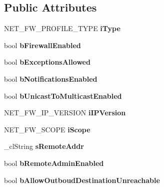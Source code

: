 \subsection*{Public Attributes}
\begin{DoxyCompactItemize}
\item 
\hypertarget{classcl_fw_profile_a5e3799163b148b64739d65f0087edef5}{
NET\_\-FW\_\-PROFILE\_\-TYPE {\bfseries iType}}
\label{classcl_fw_profile_a5e3799163b148b64739d65f0087edef5}

\item 
\hypertarget{classcl_fw_profile_ac478a134b5ffeb998ef8cc2262bd218f}{
bool {\bfseries bFirewallEnabled}}
\label{classcl_fw_profile_ac478a134b5ffeb998ef8cc2262bd218f}

\item 
\hypertarget{classcl_fw_profile_a220eca55fa271ab2137e6c2c670f8657}{
bool {\bfseries bExceptionsAllowed}}
\label{classcl_fw_profile_a220eca55fa271ab2137e6c2c670f8657}

\item 
\hypertarget{classcl_fw_profile_a7c71e03545397b2a881b934a39720778}{
bool {\bfseries bNotificationsEnabled}}
\label{classcl_fw_profile_a7c71e03545397b2a881b934a39720778}

\item 
\hypertarget{classcl_fw_profile_a07511a17c265904e7dccc212f062b040}{
bool {\bfseries bUnicastToMulticastEnabled}}
\label{classcl_fw_profile_a07511a17c265904e7dccc212f062b040}

\item 
\hypertarget{classcl_fw_profile_adb3cc684b330247ecfd3cf9cf4bd70cb}{
NET\_\-FW\_\-IP\_\-VERSION {\bfseries iIPVersion}}
\label{classcl_fw_profile_adb3cc684b330247ecfd3cf9cf4bd70cb}

\item 
\hypertarget{classcl_fw_profile_a71e485e5c5f30a8c02a8aa16fcf01a1a}{
NET\_\-FW\_\-SCOPE {\bfseries iScope}}
\label{classcl_fw_profile_a71e485e5c5f30a8c02a8aa16fcf01a1a}

\item 
\hypertarget{classcl_fw_profile_adc6f854c578329610af4296fbbff4983}{
\_\-clString {\bfseries sRemoteAddr}}
\label{classcl_fw_profile_adc6f854c578329610af4296fbbff4983}

\item 
\hypertarget{classcl_fw_profile_ab0e73804250b17110f04dae99c6d5ab1}{
bool {\bfseries bRemoteAdminEnabled}}
\label{classcl_fw_profile_ab0e73804250b17110f04dae99c6d5ab1}

\item 
\hypertarget{classcl_fw_profile_a97aeabcef73013603540fe713616a9f7}{
bool {\bfseries bAllowOutboudDestinationUnreachable}}
\label{classcl_fw_profile_a97aeabcef73013603540fe713616a9f7}


\end{DoxyCompactItemize}
